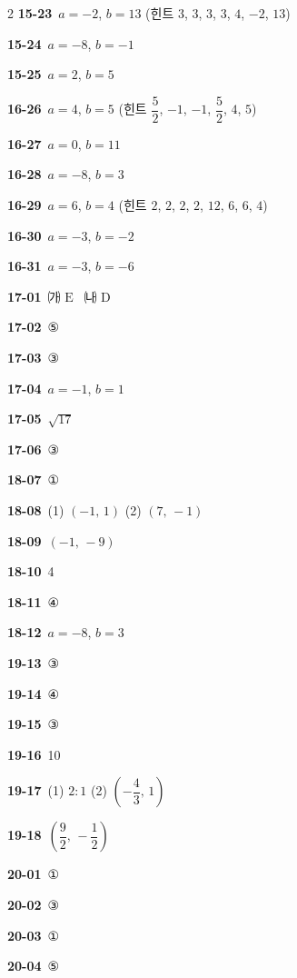 \documentclass[10pt,a4paper]{article}
\newcommand{\pt}[1]{\mathrm{#1}}
\begin{document}
\begin{multicols}{2}
\noindent\textbf{15-23}\ $a=-2$, $b=13$ (힌트 $3$, $3$, $3$, $3$, $4$, $-2$, $13$)\par
\noindent\textbf{15-24}\ $a=-8$, $b=-1$\par
\noindent\textbf{15-25}\ $a=2$, $b=5$\par
\noindent\textbf{16-26}\ $a=4$, $b=5$ (힌트 $\dfrac{5}{2}$, $-1$, $-1$, $\dfrac{5}{2}$, $4$, $5$)\par
\noindent\textbf{16-27}\ $a=0$, $b=11$\par
\noindent\textbf{16-28}\ $a=-8$, $b=3$\par
\noindent\textbf{16-29}\ $a=6$, $b=4$ (힌트 $2$, $2$, $2$, $2$, $12$, $6$, $6$, $4$)\par
\noindent\textbf{16-30}\ $a=-3$, $b=-2$\par
\noindent\textbf{16-31}\ $a=-3$, $b=-6$\par
\noindent\textbf{17-01}\ ㈎ $\pt{E}$ \ ㈏ $\pt{D}$\par
\noindent\textbf{17-02}\ ⑤\par
\noindent\textbf{17-03}\ ③\par
\noindent\textbf{17-04}\ $a=-1$, $b=1$\par
\noindent\textbf{17-05}\ $\sqrt{17}$\par
\noindent\textbf{17-06}\ ③\par
\noindent\textbf{18-07}\ ①\par
\noindent\textbf{18-08}\ (1) $(-1,\,1)$ (2) $(7,\,-1)$\par
\noindent\textbf{18-09}\ $(-1,\,-9)$\par
\noindent\textbf{18-10}\ 4\par
\noindent\textbf{18-11}\ ④\par
\noindent\textbf{18-12}\ $a=-8$, $b=3$\par
\noindent\textbf{19-13}\ ③\par
\noindent\textbf{19-14}\ ④\par
\noindent\textbf{19-15}\ ③\par
\noindent\textbf{19-16}\ 10\par
\noindent\textbf{19-17}\ (1) $2:1$ (2) $\left(-\dfrac{4}{3},\,1\right)$\par
\noindent\textbf{19-18}\ $\left(\dfrac{9}{2},\,-\dfrac{1}{2}\right)$\par
\noindent\textbf{20-01}\ ①\par
\noindent\textbf{20-02}\ ③\par
\noindent\textbf{20-03}\ ①\par
\noindent\textbf{20-04}\ ⑤\par

\end{multicols}
\end{document}
